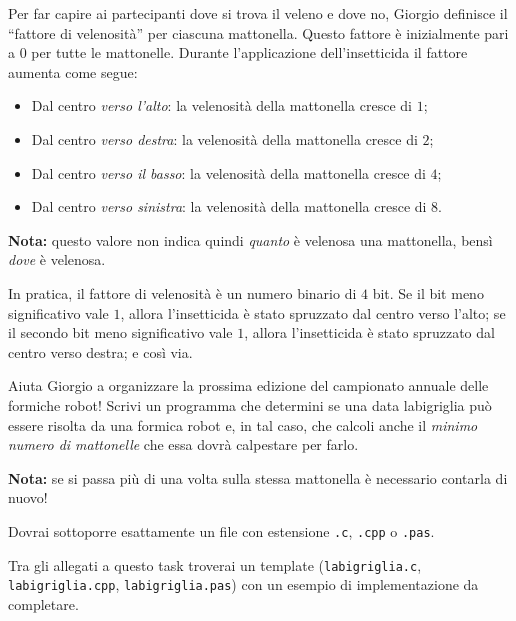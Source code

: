 Per far capire ai partecipanti dove si trova il veleno e dove no, Giorgio definisce il ``fattore di velenosità'' per ciascuna mattonella. Questo fattore è inizialmente pari a $0$ per tutte le mattonelle. Durante l'applicazione dell'insetticida il fattore aumenta come segue:

\begin{itemize} %
  \item Dal centro \emph{verso l'alto}: la velenosità della mattonella cresce di $1$;
  \item Dal centro \emph{verso destra}: la velenosità della mattonella cresce di $2$;
  \item Dal centro \emph{verso il basso}: la velenosità della mattonella cresce di $4$;
  \item Dal centro \emph{verso sinistra}: la velenosità della mattonella cresce di $8$.
\end{itemize}

\textbf{Nota:} questo valore non indica quindi \emph{quanto} è velenosa una mattonella, bensì \emph{dove} è velenosa.

\begin{warning}
  In pratica, il fattore di velenosità è un numero binario di $4$ bit. Se il bit meno significativo vale $1$, allora l'insetticida è stato spruzzato dal centro verso l'alto; se il secondo bit meno significativo vale $1$, allora l'insetticida è stato spruzzato dal centro verso destra; e così via.
\end{warning}

Aiuta Giorgio a organizzare la prossima edizione del campionato annuale delle formiche robot! Scrivi un programma che determini se una data labigriglia può essere risolta da una formica robot e, in tal caso, che calcoli anche il \emph{minimo numero di mattonelle} che essa dovrà calpestare per farlo.

\textbf{Nota:} se si passa più di una volta sulla stessa mattonella è necessario contarla di nuovo!

\Implementation
Dovrai sottoporre esattamente un file con estensione \texttt{.c}, \texttt{.cpp} o \texttt{.pas}.

\begin{warning}
Tra gli allegati a questo task troverai un template (\texttt{labigriglia.c}, \texttt{labigriglia.cpp}, \texttt{labigriglia.pas}) con un esempio di implementazione da completare.
\end{warning}

